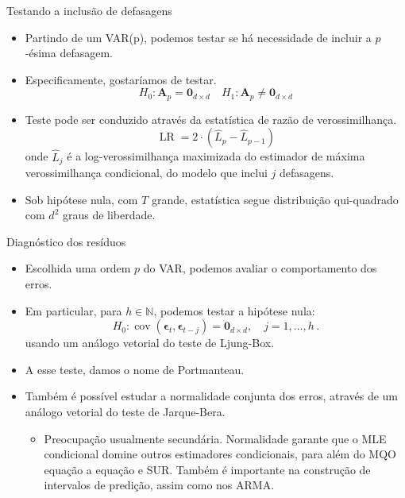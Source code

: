 \documentclass[11pt]{beamer}
\begin{document}
\begin{frame}{Testando a inclusão de defasagens}
\begin{itemize}
	\item Partindo de um VAR(p), podemos testar se há necessidade de incluir a $p$-ésima defasagem.
	\item Especificamente, gostaríamos de testar.
	\begin{equation}
		H_0: \boldsymbol{A}_p = \boldsymbol{0}_{d \times d} \quad H_1:  \boldsymbol{A}_p \neq \boldsymbol{0}_{d \times d}
	\end{equation} 
	\item Teste pode ser conduzido através da estatística de razão de verossimilhança.
	\begin{equation}
		\operatorname{LR} = 2\cdot(\hat{L}_{p} - \hat{L}_{p-1})
	\end{equation}
	onde $\hat{L}_j$ é a log-verossimilhança maximizada do estimador de máxima verossimilhança condicional, do modelo que inclui $j$ defasagens.
	\item Sob hipótese nula, com $T$ grande, estatística segue distribuição qui-quadrado com $d^2$ graus de liberdade.
\end{itemize}
\end{frame}

\begin{frame}{Diagnóstico dos resíduos}
	\begin{itemize}
		\item Escolhida uma ordem $p$ do VAR, podemos avaliar o comportamento dos erros.
		\item Em particular, para $h \in \mathbb{N}$, podemos testar a hipótese nula:
		$$H_0: \operatorname{cov}(\boldsymbol{\epsilon}_{t}, \boldsymbol{\epsilon}_{t-j}) = \boldsymbol{0}_{d\times d}, \quad j=1,\ldots, h\, .$$
		usando um análogo vetorial do teste de Ljung-Box.
		\item A esse teste, damos o nome de {\color{blue}Portmanteau}.
		\item Também é possível estudar a normalidade conjunta dos erros, através de um análogo vetorial do teste de Jarque-Bera.
		\begin{itemize}
			\item Preocupação usualmente secundária. Normalidade garante que o MLE condicional domine outros estimadores condicionais, para além do MQO equação a equação e SUR. Também é importante na construção de intervalos de predição, assim como nos ARMA.
		\end{itemize}
	\end{itemize}
\end{frame}
\end{document}
